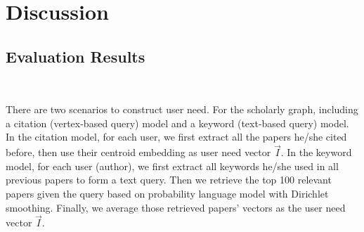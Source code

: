 \section{Discussion} 
\subsection{Evaluation Results}  \

There are two scenarios to construct user need. For the scholarly graph, including a citation (vertex-based query) model and a keyword (text-based query) model. In the citation model, for each user, we first extract all the papers he/she cited before, then use their centroid embedding as user need vector  $\vec{I}$. In the keyword model, for each user (author), we first extract all keywords he/she used in all previous papers to form a text query. Then we retrieve the top 100 relevant papers given the query based on probability language model with Dirichlet smoothing. Finally, we average those retrieved papers' vectors as the user need vector $\vec{I}$.


